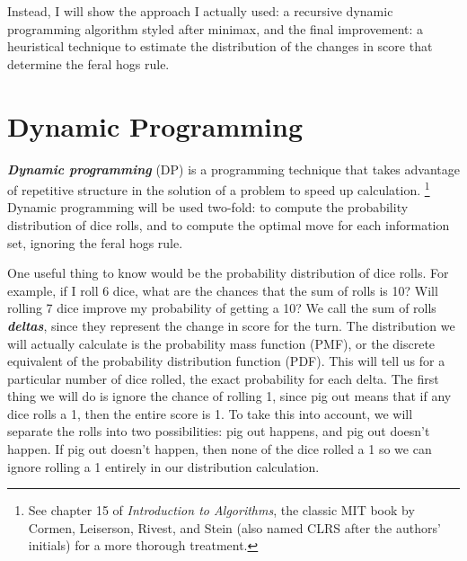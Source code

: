 \documentclass[11pt, oneside]{article}
\newcommand{\emphasis}[1]{\textbf{\textit{#1}}}
\begin{document}
Instead, I will show the approach I actually used: a recursive dynamic programming
algorithm styled after minimax, and the final improvement: 
a heuristical technique to estimate the distribution of the changes in score
that determine the feral hogs rule.

\newpage

\section{Dynamic Programming}

\emphasis{Dynamic programming} (DP) is a programming technique that takes advantage
of repetitive structure in the solution of a problem to speed up calculation. 
\footnote{See chapter 15 of \textit{Introduction to Algorithms},
the classic MIT book by Cormen, Leiserson, Rivest, and Stein
(also named CLRS after the authors' initials) for a more thorough treatment.}
Dynamic programming will be used two-fold: to compute the probability distribution
of dice rolls, and to compute the optimal move for each information set,
ignoring the feral hogs rule.

One useful thing to know would be the probability distribution of dice rolls.
For example, if I roll 6 dice, what are the chances that the sum of rolls is 10?
Will rolling 7 dice improve my probability of getting a 10?
We call the sum of rolls \emphasis{deltas}, 
since they represent the change in score for the turn.
The distribution we will actually calculate
is the probability mass function (PMF), or the discrete equivalent of the 
probability distribution function (PDF). 
This will tell us for a particular number of dice rolled,
the exact probability for each delta.
The first thing we will do is ignore the chance of rolling 1, 
since pig out means that if any dice rolls a 1, then the entire score is 1.
To take this into account, we will separate the rolls into two possibilities:
pig out happens, and pig out doesn't happen. If pig out doesn't happen,
then none of the dice rolled a 1 so we can ignore rolling a 1 entirely 
in our distribution calculation. 
\end{document}
